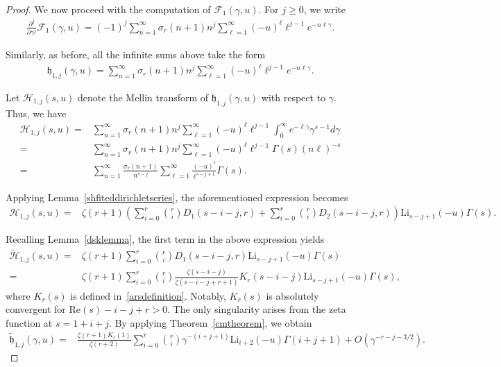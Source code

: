 \documentclass[12pt, oneside,reqno]{amsart}
\makeatletter
\numberwithin{equation}{section}
\newcommand{\doublewidetilde}[1]{{%
  \mathpalette\double@widetilde{#1}%
}}
\newcommand{\double@widetilde}[2]{%
  \sbox\z@{$\m@th#1\widetilde{#2}$}%
  \ht\z@=.9\ht\z@
  \widetilde{\box\z@}%
}
\makeatother
\begin{document}
\begin{proof}
\noindent
We now proceed with the computation of $\mathcal{F}_{1}(\gamma,u)$. For $j\geq 0$, we write
\begin{align}\label{f1derivative}
\frac{\partial^j}{\partial\gamma^j}\mathcal{F}_{1}(\gamma,u)
=(-1)^j\sum_{n=1}^{\infty}\sigma_r(n+1)n^{j}\sum_{\ell=1}^{\infty}(-u)^{\ell}\ell^{j-1}e^{-n\ell\gamma}.
\end{align}

\noindent
Similarly, as before, all the infinite sums above take the form
\begin{align*}
\mathfrak{h}_{1,j}(\gamma,u)
=\sum_{n=1}^{\infty}\sigma_r(n+1)n^{j}\sum_{\ell=1}^{\infty}(-u)^{\ell}\ell^{j-1}e^{-n\ell\gamma}.
\end{align*}

\noindent
Let $\mathcal{H}_{1,j}(s,u)$ denote the Mellin transform of $\mathfrak{h}_{1,j}(\gamma,u)$ with respect to $\gamma$. Thus, we have
\begin{align*}
\mathcal{H}_{1,j}(s,u)
=&\sum_{n=1}^{\infty}\sigma_r(n+1)n^j\sum_{\ell=1}^{\infty}(-u)^{\ell}\ell^{j-1}\int_{0}^{\infty}e^{-\ell\gamma}\gamma^{s-1}d\gamma\nonumber\\
=&\sum_{n=1}^{\infty}\sigma_r(n+1)n^j\sum_{\ell=1}^{\infty}(-u)^{\ell}\ell^{j-1}\Gamma(s)(n\ell)^{-s}\nonumber\\
=&\sum_{n=1}^{\infty}\frac{\sigma_r(n+1)}{n^{s-j}}\sum_{\ell=1}^{\infty}\frac{(-u)^{\ell}}{\ell^{s-j+1}}\Gamma(s).
\end{align*}

\noindent
Applying Lemma~\ref{shfiteddirichletseries}, the aforementioned expression becomes
\begin{align}\label{h1jmellintransform}
\mathcal{H}_{1,j}(s,u)
=&\zeta(r+1)\left(\sum_{i=0}^{r}\binom{r}{i}D_1(s-i-j,r)+\sum_{i=0}^{r}\binom{r}{i}D_2(s-i-j,r)\right)\mathrm{Li}_{s-j+1}(-u)\Gamma(s).
\end{align}

\noindent
Recalling Lemma~\ref{dsklemma}, the first term in the above expression yields
\begin{align*}
\widetilde{\mathcal{H}}_{1,j}(s,u)
=&\zeta(r+1)\sum_{i=0}^{r}\binom{r}{i}D_1(s-i-j,r)\mathrm{Li}_{s-j+1}(-u)\Gamma(s)\\
=&\zeta(r+1)\sum_{i=0}^{r}\binom{r}{i}\frac{\zeta(s-i-j)}{\zeta(s-i-j+r+1)}K_{r}(s-i-j)\mathrm{Li}_{s-j+1}(-u)\Gamma(s),
\end{align*}
where $K_r(s)$ is defined in~\eqref{arsdefinition}. Notably, $K_r(s)$ is absolutely convergent for $\mathrm{Re}(s)-i-j+r>0$. The only singularity arises from the zeta function at $s=1+i+j$. By applying Theorem~\ref{cmtheorem}, we obtain
\begin{align*}
\widetilde{\mathfrak{h}}_{1,j}(\gamma,u)
=&\frac{\zeta(r+1)K_r(1)}{\zeta(r+2)}\sum_{i=0}^{r}\binom{r}{i}\gamma^{-(i+j+1)}\mathrm{Li}_{i+2}(-u)\Gamma(i+j+1)+O(\gamma^{-r-j-3/2}).
\end{align*}


\end{proof}
\end{document}
